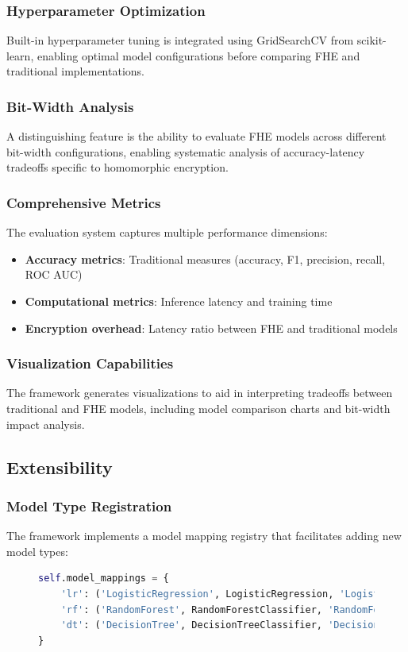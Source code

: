 \documentclass[a4paper,12pt]{article}
\begin{document}
\subsubsection{Hyperparameter Optimization}
Built-in hyperparameter tuning is integrated using GridSearchCV from scikit-learn, enabling optimal model configurations before comparing FHE and traditional implementations.

\subsubsection{Bit-Width Analysis}
A distinguishing feature is the ability to evaluate FHE models across different bit-width configurations, enabling systematic analysis of accuracy-latency tradeoffs specific to homomorphic encryption.

\subsubsection{Comprehensive Metrics}
The evaluation system captures multiple performance dimensions:
\begin{itemize}
    \item \textbf{Accuracy metrics}: Traditional measures (accuracy, F1, precision, recall, ROC AUC)
    \item \textbf{Computational metrics}: Inference latency and training time
    \item \textbf{Encryption overhead}: Latency ratio between FHE and traditional models
\end{itemize}

\subsubsection{Visualization Capabilities}
The framework generates visualizations to aid in interpreting tradeoffs between traditional and FHE models, including model comparison charts and bit-width impact analysis.

\subsection{Extensibility}
\subsubsection{Model Type Registration}
The framework implements a model mapping registry that facilitates adding new model types:

\begin{figure}[h]
    \centering
    \begin{lstlisting}[language=Python, caption=Model mapping registry, label=lst:mapping]
self.model_mappings = {
    'lr': ('LogisticRegression', LogisticRegression, 'LogisticRegression'),
    'rf': ('RandomForest', RandomForestClassifier, 'RandomForestClassifier'),
    'dt': ('DecisionTree', DecisionTreeClassifier, 'DecisionTreeClassifier'),
}
    \end{lstlisting}
\end{figure}
\end{document}
